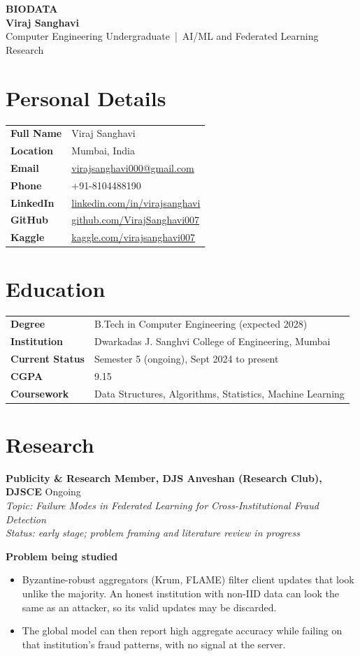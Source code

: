 \documentclass[10pt,a4paper]{article}
\newcommand{\field}[2]{\textbf{#1} & #2 \\}
\newcommand{\proj}[2]{\textbf{#1} \hfill #2}
\begin{document}
\begin{center}
{\large\bfseries BIODATA}\\[8pt]
{\LARGE\bfseries Viraj Sanghavi}\\[4pt]
\small Computer Engineering Undergraduate \,|\, AI/ML and Federated Learning Research
\end{center}

\section{Personal Details}
\begin{tabularx}{\textwidth}{@{}p{1.3in}X@{}}
\field{Full Name}{Viraj Sanghavi}
\field{Location}{Mumbai, India}
\field{Email}{\href{mailto:virajsanghavi000@gmail.com}{virajsanghavi000@gmail.com}}
\field{Phone}{+91-8104488190}
\field{LinkedIn}{\href{https://linkedin.com/in/virajsanghavi}{linkedin.com/in/virajsanghavi}}
\field{GitHub}{\href{https://github.com/VirajSanghavi007}{github.com/VirajSanghavi007}}
\field{Kaggle}{\href{https://kaggle.com/virajsanghavi007}{kaggle.com/virajsanghavi007}}
\end{tabularx}

\section{Education}
\begin{tabularx}{\textwidth}{@{}p{1.3in}X@{}}
\field{Degree}{B.Tech in Computer Engineering (expected 2028)}
\field{Institution}{Dwarkadas J. Sanghvi College of Engineering, Mumbai}
\field{Current Status}{Semester 5 (ongoing), Sept 2024 to present}
\field{CGPA}{9.15}
\field{Coursework}{Data Structures, Algorithms, Statistics, Machine Learning}
\end{tabularx}

\section{Research}
\proj{Publicity \& Research Member, DJS Anveshan (Research Club), DJSCE}{Ongoing}\\[2pt]
\textit{Topic: Failure Modes in Federated Learning for Cross-Institutional Fraud Detection}\\[2pt]
\textit{Status: early stage; problem framing and literature review in progress}

\medskip
\textbf{Problem being studied}
\begin{itemize}
  \item Byzantine-robust aggregators (Krum, FLAME) filter client updates that look unlike the majority. An honest institution with non-IID data can look the same as an attacker, so its valid updates may be discarded.
  \item The global model can then report high aggregate accuracy while failing on that institution's fraud patterns, with no signal at the server.
\end{itemize}
\end{document}
